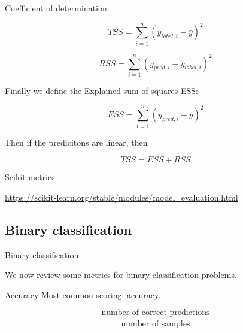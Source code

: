\documentclass[usenames,dvipsnames]{beamer}
\begin{document}
\begin{frame}{Coefficient of determination}

    \begin{equation}
        TSS = \sum^{n}_{i=1} (y_{label, i}- \bar{y})^2
    \end{equation}

    \begin{equation}
        RSS = \sum^{n}_{i=1} (y_{pred, i}-y_{label, i})^2
    \end{equation}

    Finally we define the Explained sum of squares ESS: 

    \begin{equation}
        ESS = \sum^{n}_{i=1} (y_{pred, i}- \bar{y})^2
    \end{equation}

    Then if the predicitons are linear, then

    \begin{equation}
        TSS = ESS + RSS
    \end{equation}
    
\end{frame}

\begin{frame}{Scikit metrics}

    \url{https://scikit-learn.org/stable/modules/model_evaluation.html} 
    
\end{frame}


\subsection{Binary classification}%
\label{sub:classification}

\begin{frame}{Binary classification}

    We now review some metrics for binary classification problems.
\end{frame}


\begin{frame}{Accuracy}
   Most common scoring: accuracy. 

   \begin{equation}
       \frac{\text{number of correct predictions}}{\text{number of samples}} 
   \end{equation}


\end{frame}
\end{document}
